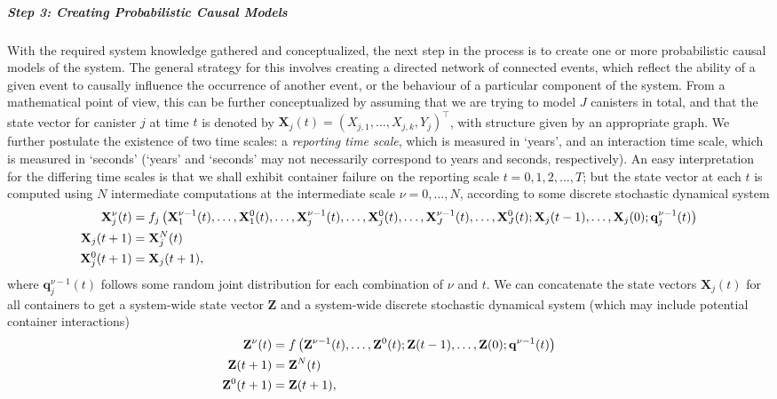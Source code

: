 \subparagraph{Step 3: Creating Probabilistic Causal Models}
\label{sec:methodstep3}
With the required system knowledge gathered and conceptualized, the next step in the process is to create one or more probabilistic causal models of the system. The general strategy for this involves creating a directed network of connected events, which reflect the ability of a given event to causally influence the occurrence of another event, or the behaviour of a particular component of the system.
\newl
From a mathematical point of view, this can be further conceptualized by assuming that we are trying to model $J$ canisters in total, and that the state vector for canister $j$ at time $t$ is denoted by $\mathbf{X}_j(t)=(X_{j,1},\ldots,X_{j,k},Y_j)^{\!\top}$, with structure given by an appropriate graph. We further postulate the existence of two time scales: a \textit{reporting time scale}, which is measured in `years', and an interaction time scale, which is measured in `seconds' (`years' and `seconds' may not necessarily correspond to years and seconds, respectively). An easy interpretation for the differing time scales is that  we shall exhibit container failure on the reporting scale $t=0,1,2,\ldots, T$; but the state vector at each $t$ is computed using $N$ intermediate computations at the intermediate scale $\nu=0,\ldots, N$, according to some discrete stochastic dynamical system  
\begin{align}
\label{eq:theds1}
\mathbf{X}^{\nu}_j(t)&=f_j\left(\mathbf{X}_1^{\nu-1}(t),\ldots,\mathbf{X}_1^{0}(t),\dots,\mathbf{X}_j^{\nu-1}(t),\ldots,\mathbf{X}_j^{0}(t),\ldots, \mathbf{X}_J^{\nu-1}(t),\ldots,\mathbf{X}_J^{0}(t); \mathbf{X}_j(t-1),\ldots,\mathbf{X}_j(0);\mathbf{q}_j^{\nu-1}(t)\right) \notag \\ 
\mathbf{X}_j(t+1)&=\mathbf{X}_j^N(t) \\
\mathbf{X}^0_j(t+1)&=\mathbf{X}_j(t+1), \notag
\end{align}
where $\mathbf{q}_j^{\nu-1}(t)$ follows some random joint distribution for each combination of $\nu$ and $t$. \newl 
We can concatenate the state vectors $\mathbf{X}_j(t)$ for all containers to get a system-wide state vector $\mathbf{Z}$ and a system-wide discrete stochastic dynamical system (which may include potential container interactions)
\begin{align}
\label{eq:thedsw}
\mathbf{Z}^{\nu}(t)&=f\left(\mathbf{Z}^{\nu-1}(t),\ldots,\mathbf{Z}^{0}(t); \mathbf{Z}(t-1),\ldots,\mathbf{Z}(0);\mathbf{q}^{\nu-1}(t)\right) \notag \\ 
\mathbf{Z}(t+1)&=\mathbf{Z}^N(t) \\
\mathbf{Z}^0(t+1)&=\mathbf{Z}(t+1), \notag
\end{align}
